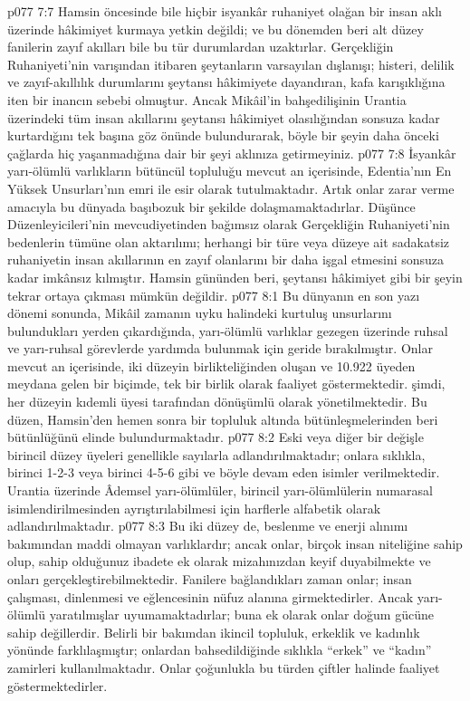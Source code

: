 \vs p077 7:7 Hamsin öncesinde bile hiçbir isyankâr ruhaniyet olağan bir insan aklı üzerinde hâkimiyet kurmaya yetkin değildi; ve bu dönemden beri alt düzey fanilerin zayıf akılları bile bu tür durumlardan uzaktırlar. Gerçekliğin Ruhaniyeti’nin varışından itibaren şeytanların varsayılan dışlanışı; histeri, delilik ve zayıf\hyp{}akıllılık durumlarını şeytansı hâkimiyete dayandıran, kafa karışıklığına iten bir inancın sebebi olmuştur. Ancak Mikâil’in bahşedilişinin Urantia üzerindeki tüm insan akıllarını şeytansı hâkimiyet olasılığından sonsuza kadar kurtardığını tek başına göz önünde bulundurarak, böyle bir şeyin daha önceki çağlarda hiç yaşanmadığına dair bir şeyi aklınıza getirmeyiniz.
\vs p077 7:8 İsyankâr yarı\hyp{}ölümlü varlıkların bütüncül topluluğu mevcut an içerisinde, Edentia’nın En Yüksek Unsurları’nın emri ile esir olarak tutulmaktadır. Artık onlar zarar verme amacıyla bu dünyada başıbozuk bir şekilde dolaşmamaktadırlar. Düşünce Düzenleyicileri’nin mevcudiyetinden bağımsız olarak Gerçekliğin Ruhaniyeti’nin bedenlerin tümüne olan aktarılımı; herhangi bir türe veya düzeye ait sadakatsiz ruhaniyetin insan akıllarının en zayıf olanlarını bir daha işgal etmesini sonsuza kadar imkânsız kılmıştır. Hamsin gününden beri, şeytansı hâkimiyet gibi bir şeyin tekrar ortaya çıkması mümkün değildir.
\vs p077 8:1 Bu dünyanın en son yazı dönemi sonunda, Mikâil zamanın uyku halindeki kurtuluş unsurlarını bulundukları yerden çıkardığında, yarı\hyp{}ölümlü varlıklar gezegen üzerinde ruhsal ve yarı\hyp{}ruhsal görevlerde yardımda bulunmak için geride bırakılmıştır. Onlar mevcut an içerisinde, iki düzeyin birlikteliğinden oluşan ve 10.922 üyeden meydana gelen bir biçimde, tek bir birlik olarak faaliyet göstermektedir. şimdi, her düzeyin kıdemli üyesi tarafından dönüşümlü olarak yönetilmektedir. Bu düzen, Hamsin’den hemen sonra bir topluluk altında bütünleşmelerinden beri bütünlüğünü elinde bulundurmaktadır.
\vs p077 8:2 Eski veya diğer bir değişle birincil düzey üyeleri genellikle sayılarla adlandırılmaktadır; onlara sıklıkla, birinci 1\hyp{}2\hyp{}3 veya birinci 4\hyp{}5\hyp{}6 gibi ve böyle devam eden isimler verilmektedir. Urantia üzerinde Âdemsel yarı\hyp{}ölümlüler, birincil yarı\hyp{}ölümlülerin numarasal isimlendirilmesinden ayrıştırılabilmesi için harflerle alfabetik olarak adlandırılmaktadır.
\vs p077 8:3 Bu iki düzey de, beslenme ve enerji alınımı bakımından maddi olmayan varlıklardır; ancak onlar, birçok insan niteliğine sahip olup, sahip olduğunuz ibadete ek olarak mizahınızdan keyif duyabilmekte ve onları gerçekleştirebilmektedir. Fanilere bağlandıkları zaman onlar; insan çalışması, dinlenmesi ve eğlencesinin nüfuz alanına girmektedirler. Ancak yarı\hyp{}ölümlü yaratılmışlar uyumamaktadırlar; buna ek olarak onlar doğum gücüne sahip değillerdir. Belirli bir bakımdan ikincil topluluk, erkeklik ve kadınlık yönünde farklılaşmıştır; onlardan bahsedildiğinde sıklıkla “erkek” ve “kadın” zamirleri kullanılmaktadır. Onlar çoğunlukla bu türden çiftler halinde faaliyet göstermektedirler.

